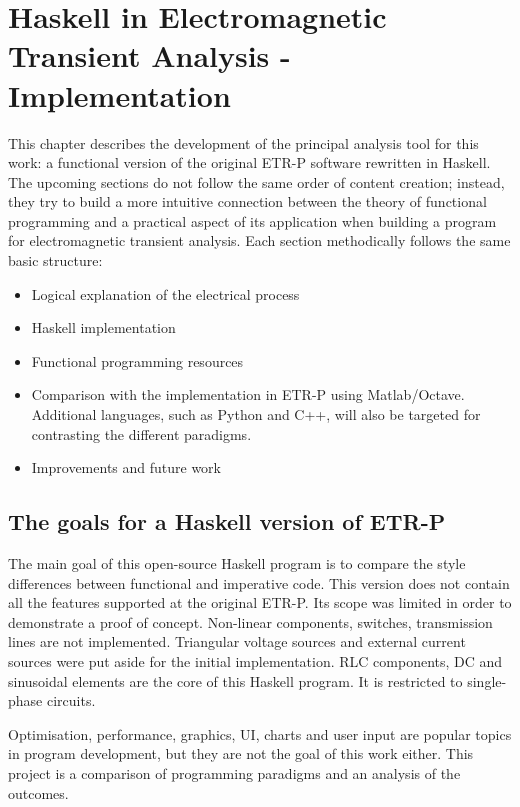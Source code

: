 \chapter{ Haskell in Electromagnetic Transient Analysis - Implementation}
\label{implhs}

This chapter describes the development of the principal analysis tool for this work: a functional version of the original ETR-P software rewritten in Haskell. The upcoming sections do not follow the same order of content creation; instead, they try to build a more intuitive connection between the theory of functional programming and a practical aspect of its application when building a program for electromagnetic transient analysis. Each section methodically follows the same basic structure:

\begin{itemize}
\item Logical explanation of the electrical process
\item Haskell implementation
\item Functional programming resources
\item Comparison with the implementation in ETR-P using Matlab/Octave. Additional languages, such as Python and C++, will also be targeted for contrasting the different paradigms.
\item Improvements and future work
\end{itemize}


\section{ The goals for a Haskell version of ETR-P }
\label{haskellgoal}

The main goal of this open-source Haskell program is to compare the style differences between functional and imperative code. This version does not contain all the features supported at the original ETR-P. Its scope was limited in order to demonstrate a proof of concept. Non-linear components, switches, transmission lines are not implemented. Triangular voltage sources and external current sources were put aside for the initial implementation. RLC components, DC and sinusoidal elements are the core of this Haskell program. It is restricted to single-phase circuits.

Optimisation, performance, graphics, UI, charts and user input are popular topics in program development, but they are not the goal of this work either. This project is a comparison of programming paradigms and an analysis of the outcomes. 

